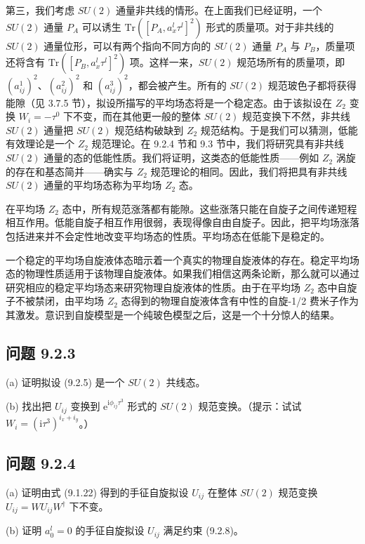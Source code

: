 第三，我们考虑 $SU(2)$ 通量非共线的情形。在上面我们已经证明，一个 $SU(2)$ 通量 $P_A$ 可以诱生 $\mathrm{Tr}([P_A,a_{x}^{l}\tau^{l}]^{2})$ 形式的质量项。对于非共线的 $SU(2)$ 通量位形，可以有两个指向不同方向的 $SU(2)$ 通量 $P_A$ 与 $P_B$，质量项还将含有 $\mathrm{Tr}([P_B,a_{x}^{l}\tau^{l}]^{2})$ 项。这样一来，$SU(2)$ 规范场所有的质量项，即 $(a_{ij}^{1})^{2}$、$(a_{ij}^{2})^{2}$ 和 $(a_{ij}^{3})^{2}$，都会被产生。所有的 $SU(2)$ 规范玻色子都将获得能隙（见 3.7.5 节），拟设所描写的平均场态将是一个稳定态。由于该拟设在 $Z_2$ 变换 $W_i=-\tau^{0}$ 下不变，而在其他更一般的整体 $SU(2)$ 规范变换下不然，非共线 $SU(2)$ 通量把 $SU(2)$ 规范结构破缺到 $Z_2$ 规范结构。于是我们可以猜测，低能有效理论是一个 $Z_2$ 规范理论。在 9.2.4 节和 9.3 节中，我们将研究具有非共线 $SU(2)$ 通量的态的低能性质。我们将证明，这类态的低能性质——例如 $Z_2$ 涡旋的存在和基态简并——确实与 $Z_2$ 规范理论的相同。因此，我们将把具有非共线 $SU(2)$ 通量的平均场态称为平均场 $Z_2$ 态。

在平均场 $Z_2$ 态中，所有规范涨落都有能隙。这些涨落只能在自旋子之间传递短程相互作用。低能自旋子相互作用很弱，表现得像自由自旋子。因此，把平均场涨落包括进来并不会定性地改变平均场态的性质。平均场态在低能下是稳定的。

一个稳定的平均场自旋液体态暗示着一个真实的物理自旋液体的存在。稳定平均场态的物理性质适用于该物理自旋液体。如果我们相信这两条论断，那么就可以通过研究相应的稳定平均场态来研究物理自旋液体的性质。由于在平均场 $Z_2$ 态中自旋子不被禁闭，由平均场 $Z_2$ 态得到的物理自旋液体含有中性的自旋-1/2 费米子作为其激发。意识到自旋模型是一个纯玻色模型之后，这是一个十分惊人的结果。

\subsection*{问题 9.2.3}

(a) 证明拟设 (9.2.5) 是一个 $SU(2)$ 共线态。

(b) 找出把 $U_{ij}$ 变换到 $\mathrm{e}^{\mathrm{i}\phi_{ij}\tau^{3}}$ 形式的 $SU(2)$ 规范变换。（提示：试试 $W_i=(\mathrm{i}\tau^{3})^{i_x+i_y}$。）

\subsection*{问题 9.2.4}

(a) 证明由式 (9.1.22) 得到的手征自旋拟设 $U_{ij}$ 在整体 $SU(2)$ 规范变换 $U_{ij}=WU_{ij}W^{\dagger}$ 下不变。

(b) 证明 $a_0^{l}=0$ 的手征自旋拟设 $U_{ij}$ 满足约束 (9.2.8)。

